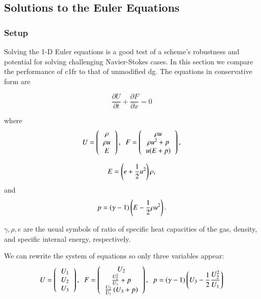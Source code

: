 \subsection{Solutions to the Euler Equations}
\label{sec:cm1frEuler}
\subsubsection{Setup}

Solving the 1-D Euler equations is a good test of a scheme's robustness and potential for solving challenging Navier-Stokes cases. In this section we compare the performance of \gls{c1fr} to that of unmodified \gls{dg}. The equations in conservative form are

 \begin{equation}\label{1dEuler}
\frac{\partial U}{\partial t} +  \frac{\partial F}{\partial x}  = 0
\end{equation}

where 
\begin{equation}
U = \l(
\begin{tabular}{c}
$\rho$\\
$\rho u$\\
$E$
\end{tabular}
\r), 
\;\;
F = \l(
\begin{tabular}{c}
$\rho u$\\
$\rho u^2 + p$\\
$ u (E + p)$
\end{tabular}
\r), 
\end{equation}

\begin{equation}
E = \left(e + \frac{1}{2}u^2 \right) \rho,
\end{equation}
and 
\begin{equation}
p = (\gamma -1) \left(E - \frac{1}{2}\rho u^2\right).
\end{equation}

$\gamma, \rho, e$ are the usual symbols of ratio of specific heat capacities of the gas, density, and specific internal energy, respectively.

We can rewrite the system of equations so only three variables appear:
\begin{equation}
U = \l(
\begin{tabular}{c}
$U_1$\\
$U_2$\\
$U_3$
\end{tabular}
\r), 
\;\;
F = \l(
\begin{tabular}{c}
$U_2$\\
$\frac{U_2^2}{U_1} + p$\\
$\frac{U_2}{U_1} \l( U_3 + p\r)$
\end{tabular}
\r), \;\;
p = (\gamma - 1)  \l(U_3 - \frac{1}{2} \frac{U_2^2}{U_1}\r)
\end{equation}

